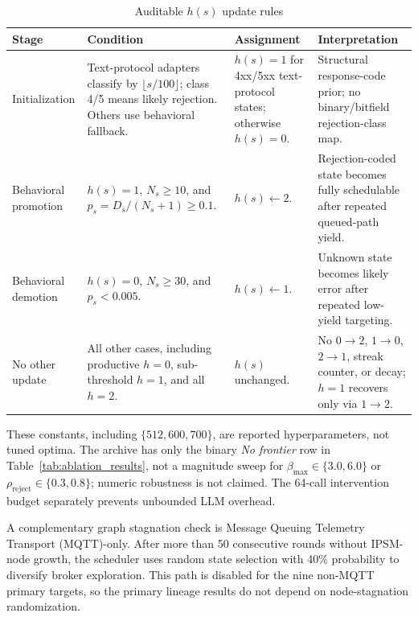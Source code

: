 \documentclass[final,5p,times,number]{elsarticle}
\begin{document}
\begin{table}[!t]
\centering
\caption{Auditable $h(s)$ update rules}
\label{tab:error_hint_update}
{\scriptsize
\setlength{\tabcolsep}{4.0pt}
\renewcommand{\arraystretch}{1.08}
\begin{tabularx}{\textwidth}{p{} p{} p{} X}
\toprule
Stage & Condition & Assignment & Interpretation \\
\midrule
Initialization &
Text-protocol adapters classify by $\lfloor s/100\rfloor$; class 4/5 means likely rejection. Others use behavioral fallback. &
$h(s)=1$ for 4xx/5xx text-protocol states; otherwise $h(s)=0$. &
Structural response-code prior; no binary/bitfield rejection-class map. \\
\midrule
Behavioral promotion &
$h(s)=1$, $N_s\ge10$, and $p_s=D_s/(N_s+1)\ge0.1$. &
$h(s)\leftarrow2$. &
Rejection-coded state becomes fully schedulable after repeated queued-path yield. \\
\midrule
Behavioral demotion &
$h(s)=0$, $N_s\ge30$, and $p_s<0.005$. &
$h(s)\leftarrow1$. &
Unknown state becomes likely error after repeated low-yield targeting. \\
\midrule
No other update &
All other cases, including productive $h=0$, sub-threshold $h=1$, and all $h=2$. &
$h(s)$ unchanged. &
No $0\!\rightarrow\!2$, $1\!\rightarrow\!0$, $2\!\rightarrow\!1$, streak counter, or decay; $h=1$ recovers only via $1\!\rightarrow\!2$. \\
\bottomrule
\end{tabularx}
}
\end{table}

These constants, including $\{512,600,700\}$, are reported hyperparameters, not tuned optima. The archive has only the binary \emph{No frontier} row in Table~\ref{tab:ablation_results}, not a magnitude sweep for $\beta_{\max}\in\{3.0,6.0\}$ or $\rho_{\mathrm{reject}}\in\{0.3,0.8\}$; numeric robustness is not claimed. The 64-call intervention budget separately prevents unbounded LLM overhead.

A complementary graph stagnation check is Message Queuing Telemetry Transport (MQTT)-only. After more than 50 consecutive rounds without IPSM-node growth, the scheduler uses random state selection with 40\% probability to diversify broker exploration. This path is disabled for the nine non-MQTT primary targets, so the primary lineage results do not depend on node-stagnation randomization.
\end{document}
